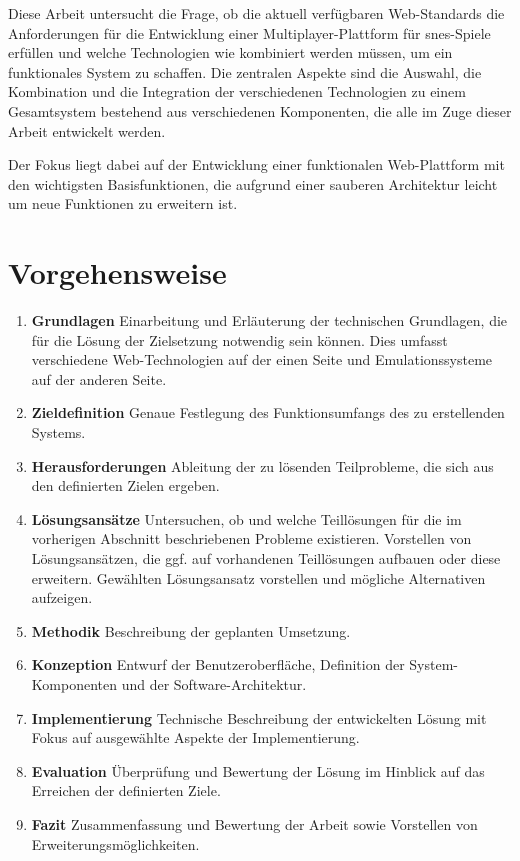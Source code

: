 Diese Arbeit untersucht die Frage, ob die aktuell verfügbaren
Web-Standards die Anforderungen für die Entwicklung einer
Multiplayer-Plattform für \gls{snes}-Spiele erfüllen und welche
Technologien wie kombiniert werden müssen, um ein funktionales System zu
schaffen. Die zentralen Aspekte sind die Auswahl, die Kombination und
die Integration der verschiedenen Technologien zu einem Gesamtsystem
bestehend aus verschiedenen Komponenten, die alle im Zuge dieser Arbeit
entwickelt werden.

Der Fokus liegt dabei auf der Entwicklung einer funktionalen
Web-Plattform mit den wichtigsten Basisfunktionen, die aufgrund einer
sauberen Architektur leicht um neue Funktionen zu erweitern ist.

\section{Vorgehensweise}\label{vorgehensweise}

\begin{enumerate}
\def\labelenumi{\arabic{enumi}.}
\tightlist
\item
  \textbf{Grundlagen} Einarbeitung und Erläuterung der technischen
  Grundlagen, die für die Lösung der Zielsetzung notwendig sein können.
  Dies umfasst verschiedene Web-Technologien auf der einen Seite und
  Emulationssysteme auf der anderen Seite.
\item
  \textbf{Zieldefinition} Genaue Festlegung des Funktionsumfangs des zu
  erstellenden Systems.
\item
  \textbf{Herausforderungen} Ableitung der zu lösenden Teilprobleme, die
  sich aus den definierten Zielen ergeben.
\item
  \textbf{Lösungsansätze} Untersuchen, ob und welche Teillösungen für
  die im vorherigen Abschnitt beschriebenen Probleme existieren.
  Vorstellen von Lösungsansätzen, die ggf. auf vorhandenen Teillösungen
  aufbauen oder diese erweitern. Gewählten Lösungsansatz vorstellen und
  mögliche Alternativen aufzeigen.
\item
  \textbf{Methodik} Beschreibung der geplanten Umsetzung.
\item
  \textbf{Konzeption} Entwurf der Benutzeroberfläche, Definition der
  System-Komponenten und der Software-Architektur.
\item
  \textbf{Implementierung} Technische Beschreibung der entwickelten
  Lösung mit Fokus auf ausgewählte Aspekte der Implementierung.
\item
  \textbf{Evaluation} Überprüfung und Bewertung der Lösung im Hinblick
  auf das Erreichen der definierten Ziele.
\item
  \textbf{Fazit} Zusammenfassung und Bewertung der Arbeit sowie
  Vorstellen von Erweiterungsmöglichkeiten.
\end{enumerate}
